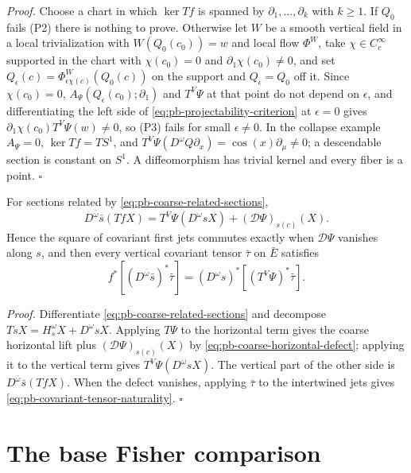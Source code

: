 \noindent\emph{Proof.}
Choose a chart in which \(\ker Tf\) is spanned by \(\partial_1,\ldots,\partial_k\) with \(k\geq1\). If
\(Q_0\) fails (P2) there is nothing to prove. Otherwise let \(W\) be a smooth vertical field in a local
trivialization with \(W(Q_0(c_0))=w\) and local flow \(\Phi^W\), take \(\chi\in C^\infty_c\) supported
in the chart with \(\chi(c_0)=0\) and \(\partial_1\chi(c_0)\ne0\), and set
\(Q_\epsilon(c)=\Phi^W_{\epsilon\chi(c)}(Q_0(c))\) on the support and \(Q_\epsilon=Q_0\) off it. Since
\(\chi(c_0)=0\), \(A_\Psi(Q_\epsilon(c_0);\partial_1)\) and \(T^V\Psi\) at that point do not depend on
\(\epsilon\), and differentiating the left side of \eqref{eq:pb-projectability-criterion} at
\(\epsilon=0\) gives \(\partial_1\chi(c_0)T^V\Psi(w)\ne0\), so (P3) fails for small
\(\epsilon\ne0\). In the collapse example \(A_\Psi=0\), \(\ker Tf=TS^1\), and
\(T^V\Psi(D^\omega Q\partial_x)=\cos(x)\partial_\mu\ne0\); a descendable section is constant on
\(S^1\). A diffeomorphism has trivial kernel and every fiber is a point. \hfill$\square$

For sections related by \eqref{eq:pb-coarse-related-sections},
\begin{equation}
D^{\bar\omega}\bar s(TfX)
=T^V\Psi(D^\omega sX)+(\mathcal D\Psi)_{s(c)}(X).
\label{eq:pb-covariant-jet-chain-rule}
\end{equation}
Hence the square of covariant first jets commutes exactly when \(\mathcal D\Psi\) vanishes along
\(s\), and then every vertical covariant tensor \(\bar\tau\) on \(\bar E\) satisfies
\begin{equation}
f^*[(D^{\bar\omega}\bar s)^*\bar\tau]
=(D^\omega s)^*[(T^V\Psi)^*\bar\tau].
\label{eq:pb-covariant-tensor-naturality}
\end{equation}

\noindent\emph{Proof.}
Differentiate \eqref{eq:pb-coarse-related-sections} and decompose
\(TsX=H_s^\omega X+D^\omega sX\). Applying \(T\Psi\) to the horizontal term gives the coarse horizontal
lift plus \((\mathcal D\Psi)_{s(c)}(X)\) by \eqref{eq:pb-coarse-horizontal-defect}; applying it to the
vertical term gives \(T^V\Psi(D^\omega sX)\). The vertical part of the other side is
\(D^{\bar\omega}\bar s(TfX)\). When the defect vanishes, applying \(\bar\tau\) to the intertwined jets
gives \eqref{eq:pb-covariant-tensor-naturality}. \hfill$\square$

\section{The base Fisher comparison}
\label{sec:pb-base-fisher-comparison}

